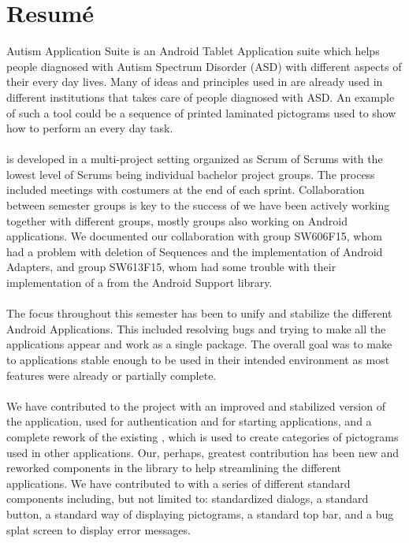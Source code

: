 \chapter{Resumé}
\giraf Autism Application Suite is an Android Tablet Application suite which helps people diagnosed with Autism Spectrum Disorder (ASD) with different aspects of their every day lives. Many of ideas and principles used in \giraf are already used in different institutions that takes care of people diagnosed with ASD. An example of such a tool could be a sequence of printed laminated pictograms used to show how to perform an every day task.       
\\\\
\giraf is developed in a multi-project setting organized as Scrum of Scrums with the lowest level of Scrums being individual bachelor project groups. The process included meetings with costumers at the end of each sprint. Collaboration between semester groups is key to the success of \giraf we have been actively working together with different groups, mostly groups also working on Android applications. We documented our collaboration with group SW606F15, whom had a problem with deletion of \giraf Sequences and the implementation of Android Adapters, and group SW613F15, whom had some trouble with their implementation of a  from the Android Support library.
\\\\
The focus throughout this semester has been to unify and stabilize the different \giraf Android Applications. This included resolving bugs and trying to make all the applications appear and work as a single package. The overall goal was to make to applications stable enough to be used in their intended environment as most features were already or partially complete.   
\\\\
We have contributed to the project with an improved and stabilized version of the \giraf \launcher application, used for authentication and for starting \giraf applications, and a complete rework of the existing \giraf \ct, which is used to create categories of pictograms used in other applications. Our, perhaps, greatest contribution has been new and reworked components in the \gc library to help streamlining the different applications. We have contributed to \gc with a series of different standard components including, but not limited to: standardized dialogs, a standard button, a standard way of displaying pictograms, a standard top bar, and a bug splat screen to display error messages.
